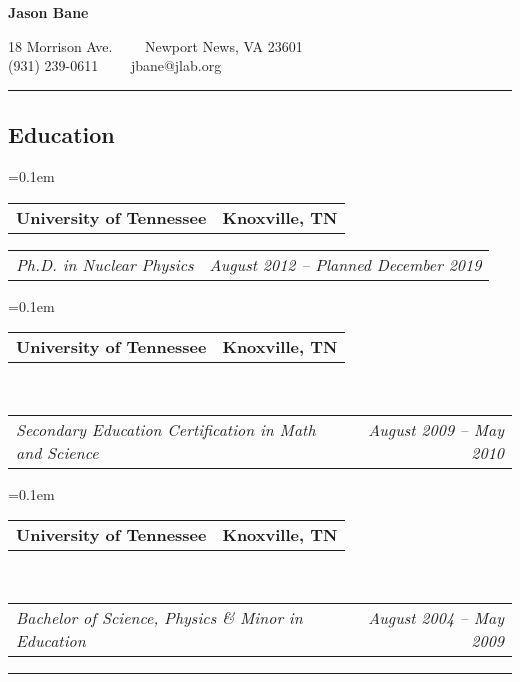\documentclass[12pt,letterpaper]{article}
\makeatletter
\newcommand{\headerrow}[2]
{\begin{tabular*}{\linewidth}{l@{\extracolsep{\fill}}r}
	#1 &
	#2 \\
\end{tabular*}}
\makeatother
\begin{document}
%


\begin{center}
{\LARGE \textbf{Jason Bane}}

18 Morrison Ave.\ \ \textbullet
\ \ Newport News, VA 23601 \\
(931) 239-0611\ \ \textbullet
\ \ jbane@jlab.org
\end{center}

\hrule
\vspace{-0.4em}
\subsection*{Education}

\begin{itemize*}
	\parskip=0.1em
	
	\item 
	\headerrow
	{\textbf{University of Tennessee}}
	{\textbf{Knoxville, TN}}
	
	\headerrow
	{\emph{Ph.D. in Nuclear Physics}}
	{\emph{August 2012 -- Planned December 2019}}
	
	
	\parskip=0.1em
	
	\item 
	\headerrow
	{\textbf{University of Tennessee}}
	{\textbf{Knoxville, TN}}
	\\
	\headerrow
	{\emph{Secondary Education Certification in Math and Science}}
	{\emph{August 2009 -- May 2010}}
	
	
	\parskip=0.1em
	
	\item 
	\headerrow
	{\textbf{University of Tennessee}}
	{\textbf{Knoxville, TN}}
	\\
	\headerrow
	{\emph{Bachelor of Science, Physics \& Minor in Education }}
	{\emph{August 2004 -- May 2009}}
	
	
\end{itemize*}
\hrule
\vspace{-0.4em}
\end{document}
